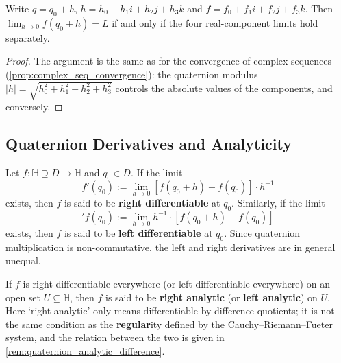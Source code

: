 \begin{proposition}\label{prop:quaternion_limit_coordinate}
Write $q = q_0 + h$, $h = h_0 + h_1 i + h_2 j + h_3 k$ and $f = f_0 + f_1 i + f_2 j + f_3 k$. Then $\lim_{h \to 0} f(q_0 + h) = L$ if and only if the four real-component limits hold separately.
\end{proposition}

\begin{proof}
The argument is the same as for the convergence of complex sequences (\cref{prop:complex_seq_convergence}): the quaternion modulus $|h| = \sqrt{h_0^2 + h_1^2 + h_2^2 + h_3^2}$ controls the absolute values of the components, and conversely.
\end{proof}

\subsection{Quaternion Derivatives and Analyticity}

\begin{definition}\label{def:quaternion_derivative}
Let $f: \mathbb{H} \supseteq D \to \mathbb{H}$ and $q_0 \in D$. If the limit
\[
f'(q_0) := \lim_{h \to 0} [f(q_0 + h) - f(q_0)] \cdot h^{-1}
\]
exists, then $f$ is said to be \textbf{right differentiable} at $q_0$. Similarly, if the limit
\[
{}'f(q_0) := \lim_{h \to 0} h^{-1} \cdot [f(q_0 + h) - f(q_0)]
\]
exists, then $f$ is said to be \textbf{left differentiable} at $q_0$. Since quaternion multiplication is non-commutative, the left and right derivatives are in general unequal.
\end{definition}

\begin{definition}\label{def:quaternion_analytic}
If $f$ is right differentiable everywhere (or left differentiable everywhere) on an open set $U \subseteq \mathbb{H}$, then $f$ is said to be \textbf{right analytic} (or \textbf{left analytic}) on $U$. Here `right analytic' only means differentiable by difference quotients; it is not the same condition as the \textbf{regular}ity defined by the Cauchy--Riemann--Fueter system, and the relation between the two is given in \cref{rem:quaternion_analytic_difference}.
\end{definition}

